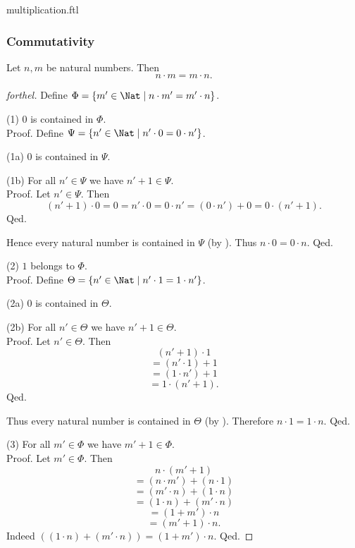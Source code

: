 \documentclass{naproche-library}
\begin{document}
\begin{smodule}{multiplication.ftl}
  \subsubsection*{Commutativity}

  \begin{proposition}[forthel,id=ARITHMETIC_06_1764759896588288,printid]
    Let $n, m$ be natural numbers.
    Then \[ n \cdot m = m \cdot n. \]
  \end{proposition}
  \begin{proof}[forthel]
    Define $\Phi = \{ m' \in \Nat \mid n \cdot m' = m' \cdot n \}$.

    (1) $0$ is contained in $\Phi$. \\
    Proof.
      Define $\Psi = \{ n' \in \Nat \mid n' \cdot 0 = 0 \cdot n' \}$.

      (1a) $0$ is contained in $\Psi$.

      (1b) For all $n' \in \Psi$ we have $n' + 1 \in \Psi$. \\
      Proof.
        Let $n' \in \Psi$.
        Then
        \[ (n' + 1) \cdot 0
          = 0
          = n' \cdot 0
          = 0 \cdot n'
          = (0 \cdot n') + 0
          = 0 \cdot (n' + 1). \]
      Qed.

      Hence every natural number is contained in $\Psi$ (by ).
      Thus $n \cdot 0 = 0 \cdot n$.
    Qed.

    (2) $1$ belongs to $\Phi$. \\
    Proof.
      Define $\Theta = \{ n' \in \Nat \mid n' \cdot 1 = 1 \cdot n' \}$.

      (2a) $0$ is contained in $\Theta$.

      (2b) For all $n' \in \Theta$ we have $n' + 1 \in \Theta$. \\
      Proof.
        Let $n' \in \Theta$.
        Then
        \[  (n' + 1) \cdot 1        \]
        \[    = (n' \cdot 1) + 1    \]
        \[    = (1 \cdot n') + 1    \]
        \[    = 1 \cdot (n' + 1).   \]
      Qed.

      Thus every natural number is contained in $\Theta$ (by ).
      Therefore $n \cdot 1 = 1 \cdot n$.
    Qed.

    (3) For all $m' \in \Phi$ we have $m' + 1 \in \Phi$. \\
    Proof.
      Let $m' \in \Phi$.
      Then
      \[  n \cdot (m' + 1)                \]
      \[    = (n \cdot m') + (n \cdot 1)  \]
      \[    = (m' \cdot n) + (1 \cdot n)  \]
      \[    = (1 \cdot n) + (m' \cdot n)  \]
      \[    = (1 + m') \cdot n            \]
      \[    = (m' + 1) \cdot n.           \]
      Indeed $((1 \cdot n) + (m' \cdot n)) = (1 + m') \cdot n$. %
    Qed.


\end{proof}
\end{smodule}
\end{document}
